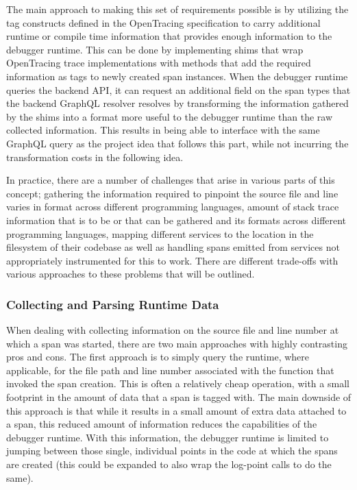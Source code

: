 \documentclass[12pt,pdftex,titlepage]{report}
\begin{document}
                    The main approach to making this set of requirements possible is by utilizing the tag constructs defined in the OpenTracing specification to carry additional runtime or
                    compile time information that provides enough information to the debugger runtime. This can be done by implementing shims that wrap OpenTracing trace implementations with
                    methods that add the required information as tags to newly created span instances. When the debugger runtime queries the backend API, it can request an additional field on
                    the span types that the backend GraphQL resolver resolves by transforming the information gathered by the shims into a format more useful to the debugger runtime than the
                    raw collected information. This results in being able to interface with the same GraphQL query as the project idea that follows this part, while not incurring the 
                    transformation costs in the following idea.

                    In practice, there are a number of challenges that arise in various parts of this concept; gathering the information required to pinpoint the source file and line varies 
                    in format across different programming languages, amount of stack trace information that is to be or that can be gathered and its formats across different programming 
                    languages, mapping different services to the location in the filesystem of their codebase as well as handling spans emitted from services not appropriately instrumented 
                    for this to work. There are different trade-offs with various approaches to these problems that will be outlined.

                \subsubsection{Collecting and Parsing Runtime Data}
                    When dealing with collecting information on the source file and line number at which a span was started, there are two main approaches with highly contrasting pros and cons.
                    The first approach is to simply query the runtime, where applicable, for the file path and line number associated with the function that invoked the span creation. This is often
                    a relatively cheap operation, with a small footprint in the amount of data that a span is tagged with. The main downside of this approach is that while it results in a small 
                    amount of extra data attached to a span, this reduced amount of information reduces the capabilities of the debugger runtime. With this information, the debugger runtime is
                    limited to jumping between those single, individual points in the code at which the spans are created (this could be expanded to also wrap the log-point calls to do the same).
                    
\end{document}
